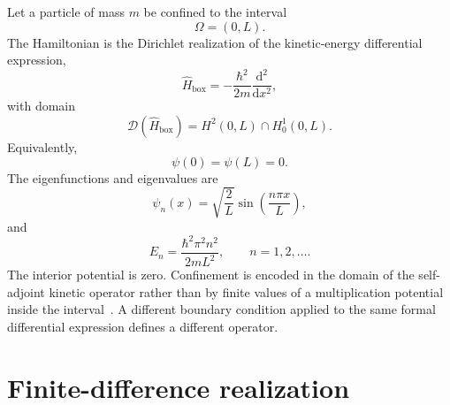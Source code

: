 Let a particle of mass $m$ be confined to the interval
\begin{equation}
    \Omega=(0,L).
\end{equation}
The Hamiltonian is the Dirichlet realization of the kinetic-energy differential
expression,
\begin{equation}
    \hat H_{\mathrm{box}}
    =
    -\frac{\hbar^2}{2m}
    \frac{\mathrm{d}^2}{\mathrm{d}x^2},
\end{equation}
with domain
\begin{equation}
    \mathcal D(\hat H_{\mathrm{box}})
    =
    H^2(0,L)\cap H_0^1(0,L).
\end{equation}
Equivalently,
\begin{equation}
    \psi(0)=\psi(L)=0.
\end{equation}
The eigenfunctions and eigenvalues are
\begin{equation}
    \psi_n(x)
    =
    \sqrt{\frac{2}{L}}
    \sin\left(\frac{n\pi x}{L}\right),
\end{equation}
and
\begin{equation}
    E_n
    =
    \frac{\hbar^2\pi^2n^2}{2mL^2},
    \qquad
    n=1,2,\ldots.
\end{equation}
The interior potential is zero. Confinement is encoded in the domain of the
self-adjoint kinetic operator rather than by finite values of a multiplication
potential inside the interval~\cite{bonneau2001,angelone2024}. A different
boundary condition applied to the same formal differential expression defines
a different operator.

\section{Finite-difference realization}



